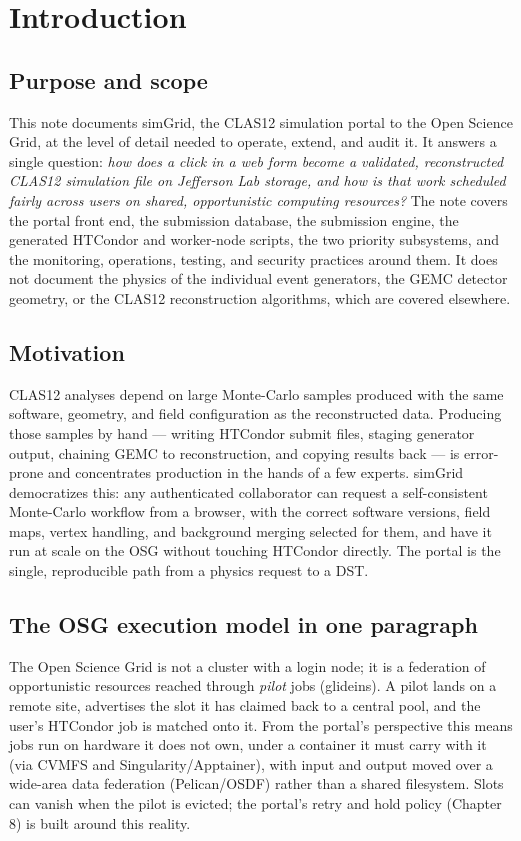 \section{Introduction}\label{ch:1}

\subsection{Purpose and scope}

This note documents simGrid, the CLAS12 simulation portal to the Open Science Grid, at the level of detail needed to operate, extend, and audit it. It answers a single question: \textit{how does a click in a web form become a validated, reconstructed CLAS12 simulation file on Jefferson Lab storage, and how is that work scheduled fairly across users on shared, opportunistic computing resources?} The note covers the portal front end, the submission database, the submission engine, the generated HTCondor and worker-node scripts, the two priority subsystems, and the monitoring, operations, testing, and security practices around them. It does not document the physics of the individual event generators, the GEMC detector geometry, or the CLAS12 reconstruction algorithms, which are covered elsewhere.

\subsection{Motivation}

CLAS12 analyses depend on large Monte-Carlo samples produced with the same software, geometry, and field configuration as the reconstructed data. Producing those samples by hand --- writing HTCondor submit files, staging generator output, chaining GEMC to reconstruction, and copying results back --- is error-prone and concentrates production in the hands of a few experts. simGrid democratizes this: any authenticated collaborator can request a self-consistent Monte-Carlo workflow from a browser, with the correct software versions, field maps, vertex handling, and background merging selected for them, and have it run at scale on the OSG without touching HTCondor directly. The portal is the single, reproducible path from a physics request to a DST.

\subsection{The OSG execution model in one paragraph}

The Open Science Grid is not a cluster with a login node; it is a federation of opportunistic resources reached through \textit{pilot} jobs (glideins). A pilot lands on a remote site, advertises the slot it has claimed back to a central pool, and the user's HTCondor job is matched onto it. From the portal's perspective this means jobs run on hardware it does not own, under a container it must carry with it (via CVMFS and Singularity/Apptainer), with input and output moved over a wide-area data federation (Pelican/OSDF) rather than a shared filesystem. Slots can vanish when the pilot is evicted; the portal's retry and hold policy (Chapter 8) is built around this reality.

